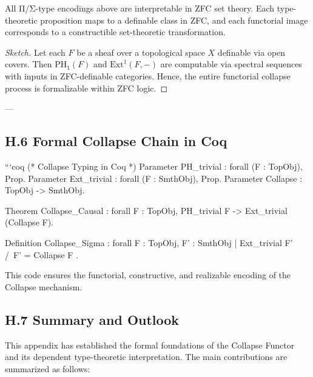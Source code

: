 \documentclass[11pt]{article}
\begin{document}
\begin{proposition}
All Π/Σ-type encodings above are interpretable in ZFC set theory. Each type-theoretic proposition maps to a definable class in ZFC, and each functorial image corresponds to a constructible set-theoretic transformation.
\end{proposition}

\begin{proof}[Sketch]
Let each $F$ be a sheaf over a topological space $X$ definable via open covers. Then $\mathrm{PH}_1(F)$ and $\mathrm{Ext}^1(F,-)$ are computable via spectral sequences with inputs in ZFC-definable categories. Hence, the entire functorial collapse process is formalizable within ZFC logic.
\end{proof}

---

\subsection*{H.6 Formal Collapse Chain in Coq}

```coq
(* Collapse Typing in Coq *)
Parameter PH_trivial : forall (F : TopObj), Prop.
Parameter Ext_trivial : forall (F : SmthObj), Prop.
Parameter Collapse : TopObj -> SmthObj.

Theorem Collapse_Causal :
  forall F : TopObj, PH_trivial F -> Ext_trivial (Collapse F).

Definition Collapse_Sigma :
  forall F : TopObj,
    { F' : SmthObj | Ext_trivial F' /\ F' = Collapse F }.

This code ensures the functorial, constructive, and realizable encoding of the Collapse mechanism.

\subsection*{H.7 Summary and Outlook}

This appendix has established the formal foundations of the Collapse Functor and its dependent type-theoretic interpretation. The main contributions are summarized as follows:
\end{document}

